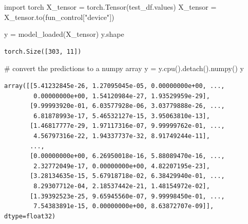 \documentclass[
  letterpaper,
  DIV=11,
  numbers=noendperiod]{scrreprt}
\newenvironment{Shaded}{\begin{snugshade}}{\end{snugshade}}
\newcommand{\CommentTok}[1]{\textcolor[rgb]{0.37,0.37,0.37}{#1}}
\newcommand{\ImportTok}[1]{\textcolor[rgb]{0.00,0.46,0.62}{#1}}
\newcommand{\NormalTok}[1]{\textcolor[rgb]{0.00,0.23,0.31}{#1}}
\newcommand{\OperatorTok}[1]{\textcolor[rgb]{0.37,0.37,0.37}{#1}}
\newcommand{\StringTok}[1]{\textcolor[rgb]{0.13,0.47,0.30}{#1}}
\begin{document}
\begin{Shaded}
\begin{Highlighting}[]
\ImportTok{import}\NormalTok{ torch}
\NormalTok{X\_tensor }\OperatorTok{=}\NormalTok{ torch.Tensor(test\_df.values)}
\NormalTok{X\_tensor }\OperatorTok{=}\NormalTok{ X\_tensor.to(fun\_control[}\StringTok{"device"}\NormalTok{])}
\end{Highlighting}
\end{Shaded}

\begin{Shaded}
\begin{Highlighting}[]
\NormalTok{y }\OperatorTok{=}\NormalTok{ model\_loaded(X\_tensor)}
\NormalTok{y.shape}
\end{Highlighting}
\end{Shaded}

\begin{verbatim}
torch.Size([303, 11])
\end{verbatim}

\begin{Shaded}
\begin{Highlighting}[]
\CommentTok{\# convert the predictions to a numpy array}
\NormalTok{y }\OperatorTok{=}\NormalTok{ y.cpu().detach().numpy()}
\NormalTok{y}
\end{Highlighting}
\end{Shaded}

\begin{verbatim}
array([[5.41232845e-26, 1.27095045e-05, 0.00000000e+00, ...,
        0.00000000e+00, 1.54120984e-27, 1.93529959e-29],
       [9.99993920e-01, 6.03577928e-06, 3.03779888e-26, ...,
        6.81878993e-17, 5.46532127e-15, 3.95063810e-13],
       [1.46817777e-29, 1.97117316e-07, 9.99999762e-01, ...,
        4.56797316e-22, 1.94337737e-32, 8.91749244e-11],
       ...,
       [0.00000000e+00, 6.26950018e-16, 5.88089470e-16, ...,
        2.32772049e-17, 0.00000000e+00, 4.82207195e-23],
       [3.28134635e-15, 5.67918718e-02, 6.38429940e-01, ...,
        8.29307712e-04, 2.18537442e-21, 1.48154972e-02],
       [1.39392523e-25, 9.65945560e-07, 9.99998450e-01, ...,
        7.54383891e-15, 0.00000000e+00, 8.63872707e-09]], dtype=float32)
\end{verbatim}
\end{document}
